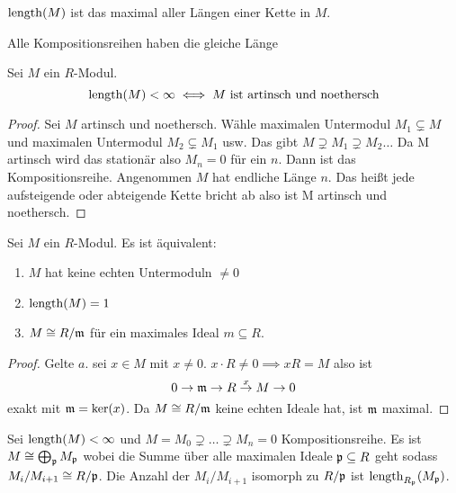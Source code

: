 \begin{Kor}
    $\operatorname{length}(M)$ ist das maximal aller Längen einer Kette in $M$.
\end{Kor}
\begin{Kor}
    Alle Kompositionsreihen haben die gleiche Länge
\end{Kor}
\begin{Satz}\label{Satz:EndlLenNoethArtin}
    Sei $M$ ein $R$-Modul. 
    $$\operatorname{length}(M)<\infty\iff M\text{ ist artinsch und noethersch}$$
\end{Satz}
\begin{proof}
    Sei $M$ artinsch und noethersch. Wähle maximalen Untermodul $M_1\subsetneq M$ und maximalen Untermodul $M_2\subsetneq M_1$ usw. Das gibt $M\supsetneq M_1\supsetneq M_2\dots$ Da M artinsch wird das stationär also $M_n=0$ für ein $n$. Dann ist das Kompositionsreihe.
    Angenommen $M$ hat endliche Länge $n$. Das heißt jede aufsteigende oder abteigende Kette bricht ab also ist M artinsch und noethersch.
\end{proof}
\begin{Satz}
    Sei $M$ ein $R$-Modul. Es ist äquivalent:
    \begin{enumerate}
        \item $M$ hat keine echten Untermoduln $\neq 0$
        \item $\operatorname{length}(M)=1$
        \item $M\cong R/\mathfrak{m}$ für ein maximales Ideal $m\subseteq R$.
    \end{enumerate}
\end{Satz}
\begin{proof}
    Gelte $a$. sei $x\in M$ mit $x\neq 0$. $x\cdot R\neq 0\implies xR=M$ also ist $$0\to \mathfrak{m}\to R\stackrel x \to M\to 0$$ exakt mit $\mathfrak{m}=\ker(x)$. Da $M\cong R/\mathfrak{m}$ keine echten Ideale hat, ist $\mathfrak{m}$ maximal.
\end{proof}
\begin{Satz}\label{Satz:StrukturModEndlLength}
    Sei $\operatorname{length}(M)<\infty$ und $M=M_0\supsetneq\dots\supsetneq M_n=0$ Kompositionsreihe. Es ist $M\cong \bigoplus_{\mathfrak{p}} M_{\mathfrak{p}}$ wobei die Summe über alle maximalen Ideale $\mathfrak{p}\subseteq R$ geht sodass $M_i/M_{i+1}\cong R/\mathfrak{p}$.
    Die Anzahl der $M_i/M_{i+1}$ isomorph zu $R/\mathfrak{p}$ ist $\operatorname{length}_{R_{\mathfrak{p}}}(M_{\mathfrak{p}})$.
\end{Satz}
